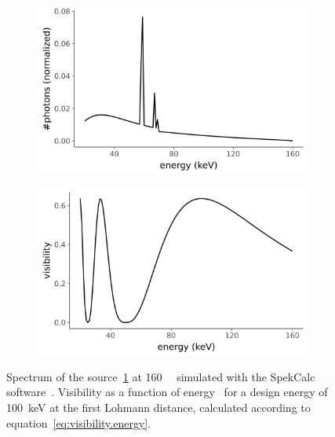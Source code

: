 \begin{figure}[htb]
    \centering
    \begin{subfigure}[b]{.49\textwidth}
    \centering
    \includegraphics[width=\textwidth]{gfx/spectrum-visibility/spectrum.png}
    \caption{}
    \label{fig:spectrum}
    \end{subfigure}
    \hfill
    \begin{subfigure}[b]{.49\textwidth}
    \centering
    \includegraphics[width=\textwidth]{gfx/spectrum-visibility/visibility.png}
    \caption{}
    \label{fig:visibility}
    \end{subfigure}
    \caption[Spectrum and theoretical visibility of the \SI{100}{\kilo\eV}
    interferometer.]{Spectrum of the source~\ref{fig:spectrum} at \SI{160}{\kilo\voltpeak}
simulated with the SpekCalc software~\cite{spekcalc}. Visibility as a
function of energy~\cite{Thuering20130027} for a design energy of \SI{100}{\kilo\eV} at the first
Lohmann distance, calculated according to
equation~\ref{eq:visibility.energy}.}
    \label{fig:visibility.energy}
\end{figure}

